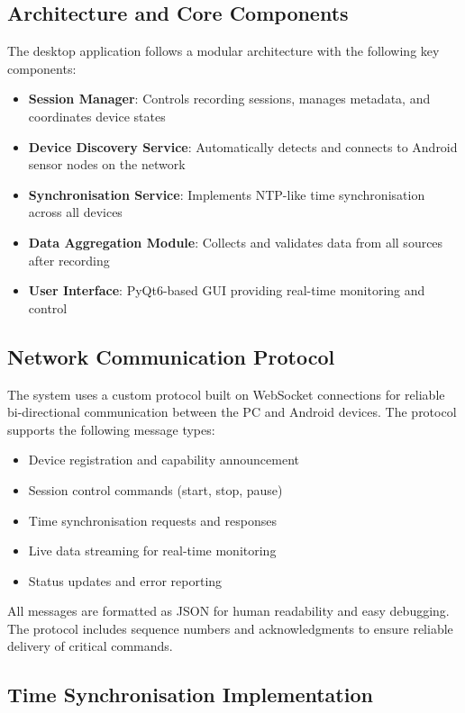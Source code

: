 \subsection{Architecture and Core Components}

The desktop application follows a modular architecture with the following key components:

\begin{itemize}
\item \textbf{Session Manager}: Controls recording sessions, manages metadata, and coordinates device states
\item \textbf{Device Discovery Service}: Automatically detects and connects to Android sensor nodes on the network
\item \textbf{Synchronisation Service}: Implements NTP-like time synchronisation across all devices
\item \textbf{Data Aggregation Module}: Collects and validates data from all sources after recording
\item \textbf{User Interface}: PyQt6-based GUI providing real-time monitoring and control~\cite{pyqt2025documentation}
\end{itemize}

\subsection{Network Communication Protocol}

The system uses a custom protocol built on WebSocket connections for reliable bi-directional communication between the PC and Android devices. The protocol supports the following message types:

\begin{itemize}
\item Device registration and capability announcement
\item Session control commands (start, stop, pause)
\item Time synchronisation requests and responses
\item Live data streaming for real-time monitoring
\item Status updates and error reporting
\end{itemize}

All messages are formatted as JSON for human readability and easy debugging. The protocol includes sequence numbers and acknowledgments to ensure reliable delivery of critical commands.

\subsection{Time Synchronisation Implementation}

